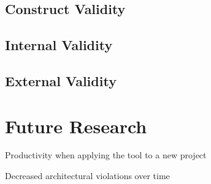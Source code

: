 \subsection{Construct Validity}

\subsection{Internal Validity}

\subsection{External Validity}

\section{Future Research}

Productivity when applying the tool to a new project

Decreased architectural violations over time


